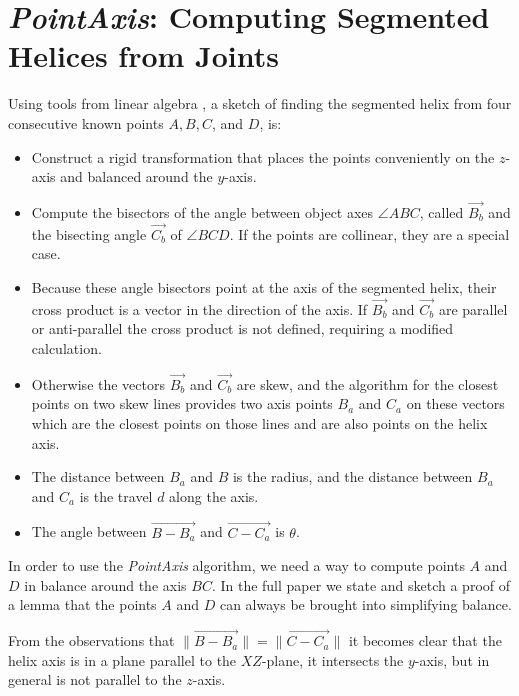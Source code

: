 \documentclass{svproc}
\begin{document}
\section{{\em PointAxis}: Computing Segmented Helices from Joints}
\label{sec:pointaxis}

Using tools from linear algebra \cite{kahn1989defining}, a sketch of finding the segmented helix from
four consecutive known points $A,B,C$, and $D$, is:
\begin{itemize}
\item Construct a rigid transformation that places the points conveniently on the $z$-axis and balanced
  around the $y$-axis.
\item Compute the bisectors of the angle between object axes $ \angle{ABC}$, called $\overrightarrow{B_b}$ and the
  bisecting angle $\overrightarrow{C_b}$ of $\angle{BCD}$.
  If the points are collinear, they are a special case.
\item Because these angle bisectors point at the axis of the segmented helix, their cross product is a vector
  in the direction of the axis. If $\overrightarrow{B_b}$ and $\overrightarrow{C_b}$ are parallel or anti-parallel the cross product is not defined, requiring a modified calculation.
\item  Otherwise the vectors $\overrightarrow{B_b}$ and $\overrightarrow{C_b}$ are skew, and the algorithm for the closest points on
  two skew lines provides two axis points $B_a$ and $C_a$ on these vectors which
  are the closest points on those lines and are also points on the helix axis.
\item The distance between $B_a$ and $B$ is the radius, and the distance between $B_a$ and $C_a$ is the travel $d$ along the axis.
  \item The angle between $\overrightarrow{B - B_a}$ and $\overrightarrow{C - C_a}$ is $\theta$.
\end{itemize}

In order to use the {\em PointAxis} algorithm, we need a way
to compute points $A$ and $D$ in balance around the axis $BC$. In the full paper\cite{readfullsegmentedhelix}
we state and sketch a proof of a lemma that the points $A$ and $D$ can always be brought into simplifying balance.

From the observations that $\| \overrightarrow{B - B_a} \| = \| \overrightarrow{C - C_a} \|$
it becomes clear that the helix axis is in a plane
parallel to the $XZ$-plane, it intersects the $y$-axis, but in general is
not parallel to the $z$-axis.
\end{document}
